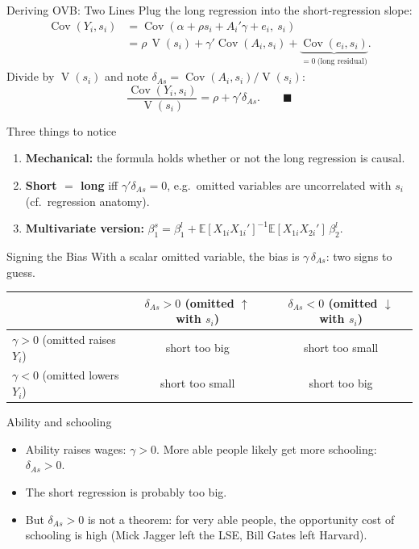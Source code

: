 \documentclass[aspectratio=169,11pt]{beamer}
\newcommand{\E}{\mathbb{E}}
\newcommand{\Var}{\operatorname{V}}
\newcommand{\Cov}{\operatorname{Cov}}
\begin{document}
\begin{frame}{Deriving OVB: Two Lines}
\small
Plug the long regression into the short-regression slope:
\[
\begin{aligned}
\Cov(Y_i,s_i)
&=\Cov(\alpha+\rho s_i+A_i'\gamma+e_i,\ s_i)\\
&=\rho\,\Var(s_i)+\gamma'\Cov(A_i,s_i)+\underbrace{\Cov(e_i,s_i)}_{=0\ \text{(long residual)}} .
\end{aligned}
\]
Divide by $\Var(s_i)$ and note $\delta_{As}=\Cov(A_i,s_i)/\Var(s_i)$:
\[
\frac{\Cov(Y_i,s_i)}{\Var(s_i)}=\rho+\gamma'\delta_{As}. \qquad\blacksquare
\]
\begin{block}{Three things to notice}
\begin{enumerate}
\item \textbf{Mechanical:} the formula holds whether or not the long regression is causal.
\item \textbf{Short $=$ long} iff $\gamma'\delta_{As}=0$, e.g.\ omitted variables are uncorrelated with $s_i$ (cf.\ regression anatomy).
\item \textbf{Multivariate version:} $\beta_1^s=\beta_1^l+\E[X_{1i}X_{1i}']^{-1}\E[X_{1i}X_{2i}']\,\beta_2^l$.
\end{enumerate}
\end{block}
\end{frame}

\begin{frame}{Signing the Bias}
\small
With a scalar omitted variable, the bias is $\gamma\,\delta_{As}$: two signs to guess.
\medskip
\begin{center}
\renewcommand{\arraystretch}{1.3}
\begin{tabular}{@{}lcc@{}}
\toprule
& $\delta_{As}>0$ (omitted $\uparrow$ with $s_i$) & $\delta_{As}<0$ (omitted $\downarrow$ with $s_i$)\\
\midrule
$\gamma>0$ (omitted raises $Y_i$) & \alert{short too big} & short too small\\
$\gamma<0$ (omitted lowers $Y_i$) & short too small & \alert{short too big}\\
\bottomrule
\end{tabular}
\end{center}
\medskip
\begin{block}{Ability and schooling}
\begin{itemize}
\item Ability raises wages: $\gamma>0$. More able people likely get more schooling: $\delta_{As}>0$.
\item[$\Rightarrow$] The short regression is probably \alert{too big}.
\item But $\delta_{As}>0$ is not a theorem: for very able people, the opportunity cost of schooling is high (Mick Jagger left the LSE, Bill Gates left Harvard).
\end{itemize}
\end{block}
\end{frame}
\end{document}
